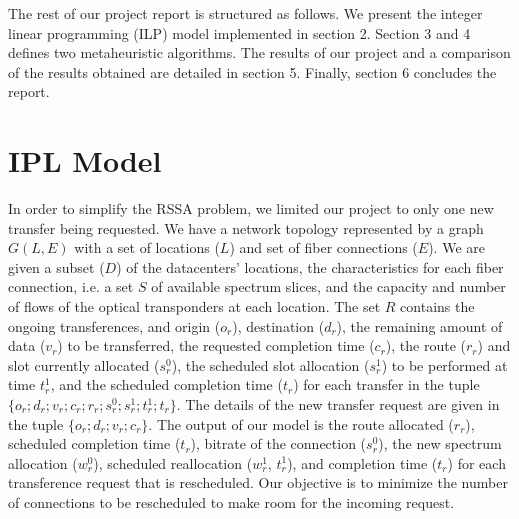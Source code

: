 \documentclass[11pt,a4paper]{article}
\begin{document}
The rest of our project report is structured as follows. We present the integer linear programming (ILP) model implemented in section 2. Section 3 and 4 defines two metaheuristic algorithms. The results of our project and a comparison of the results obtained are detailed in section 5. Finally, section 6 concludes the report.

\section{IPL Model}

In order to simplify the RSSA problem, we limited our project to only one new transfer being requested. We have a network topology represented by a graph $G(L,E)$ with a set of locations ($L$) and set of fiber connections ($E$). We are given a subset ($D$) of the datacenters' locations, the characteristics for each fiber connection, i.e. a set $S$ of available spectrum slices, and the capacity and number of flows of the optical transponders at each location. The set $R$ contains the ongoing transferences, and origin ($o_{r}$), destination ($d_{r}$), the remaining amount of data ($v_{r}$) to be transferred, the requested completion time ($c_{r}$), the route ($r_{r}$) and slot currently allocated ($s^{0}_{r}$), the scheduled slot allocation ($s^{1}_{r}$) to be performed at time $t^{1}_{r}$, and the scheduled completion time ($t_{r}$) for each transfer in the tuple $\{o_{r}; d_{r}; v_{r}; c_{r}; r_{r}; s^{0}_{r} ; s^{1}_{r} ; t^{1}_{r} ; t_{r}\}$. The details of the new transfer request are given in the tuple $\{o_{r}; d_{r}; v_{r}; c_{r}\}$. The output of our model is the route allocated ($r_{r}$), scheduled completion time ($t_{r}$), bitrate of the connection ($s^{0}_{r}$), the new spectrum allocation ($w^{0}_{r}$), scheduled reallocation ($w^{1}_{r}$, $t^{1}_{r}$), and completion time ($t_{r}$) for each transference request that is rescheduled. Our objective is to minimize the number of connections to be rescheduled to make room for the incoming request.\\
\end{document}
